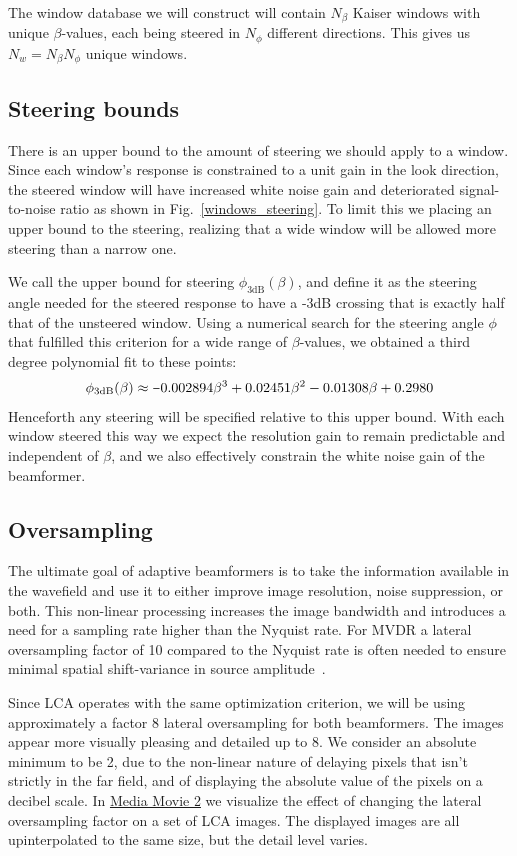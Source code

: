 \documentclass[10pt,journal,draftclsnofoot,onecolumn]{IEEEtran}
\newcounter{todoidx}
\newlength\marginparwidthsmall
\newcommand\todo[1]{%
      \addtocounter{todoidx}{1}%
      {\color{Red}\bf(\thetodoidx{})}%
      \marginpar{%
         {\vspace*{-10pt}\color{Red}\fbox{\bf\thetodoidx{}}}\\%
         \fcolorbox{red}{todobackground}{\parbox{\marginparwidthsmall}{\raggedright\scriptsize #1}}}}
\newcommand\todo[1]{}
\newcommand\Fig[1]{Fig.~\ref{#1}}
\newcommand\1{\vec 1}
\newcommand\minus{\scalebox{0.75}[1.0]{$-$}}
\newcommand\multimedia[2]{\href{#1}{#2}}
\newcommand\mediaPath{gfx/media}
\newcommand\mediaII{\multimedia{\mediaPath/media2.mp4}{Media Movie 2}}
\begin{document}
The window database we will construct will contain $N_\beta$ Kaiser windows with unique $\beta$-values, each being steered in $N_\phi$ different directions. This gives us $N_w = N_\beta N_\phi$ unique windows.


\subsection{Steering bounds}

There is an upper bound to the amount of steering we should apply to a window. Since each window's response is constrained to a unit gain in the look direction, the steered window will have increased white noise gain and deteriorated signal-to-noise ratio as shown in \Fig{windows_steering}. To limit this we placing an upper bound to the steering, realizing that  a wide window will be allowed more steering than a narrow one.

We call the upper bound for steering $\phi_{\text{3dB}}(\beta)$, and define it as the steering angle needed for the steered response to have a -3dB crossing that is exactly half that of the unsteered window. Using a numerical search for the steering angle $\phi$ that fulfilled this criterion for a wide range of $\beta$-values, we obtained a third degree polynomial fit to these points:
%
\begin{align}
\phi_\text{3dB}(\beta) \approx \minus{}0.002894\beta^3 + 0.02451\beta^2 - 0.01308\beta + 0.2980
\end{align}
%
Henceforth any steering will be specified relative to this upper bound. With each window steered this way we expect the resolution gain to remain predictable and independent of $\beta$, and we also effectively constrain the white noise gain of the beamformer.


\subsection{Oversampling}

The ultimate goal of adaptive beamformers is to take the information available in the wavefield and use it to either improve image resolution, noise suppression, or both. This non-linear processing increases the image bandwidth and introduces a need for a sampling rate higher than the Nyquist rate. For MVDR a lateral oversampling factor of 10 compared to the Nyquist rate is often needed to ensure minimal spatial shift-variance in source amplitude~\cite{Asen2014}.

Since LCA operates with the same optimization criterion, we will be using approximately a factor 8 lateral oversampling for both beamformers. The images appear more visually pleasing and detailed up to 8. We consider an absolute minimum to be 2, due to the non-linear nature of delaying pixels that isn't strictly in the far field, and of displaying the absolute value of the pixels on a decibel scale. In \mediaII{} we visualize the effect of changing the lateral oversampling factor on a set of LCA images. The displayed images are all upinterpolated to the same size, but the detail level varies. 
% 
\end{document}
